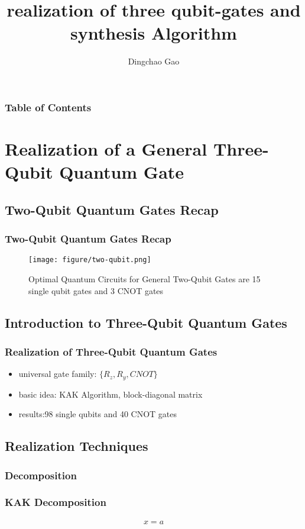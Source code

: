 \documentclass[aspectratio=1610]{beamer}
\title[gates \& synthesis]{realization of three qubit-gates and synthesis Algorithm}
\author[Gcc]{Dingchao Gao}
\institute[ISCAS]{Institute of Software Chinese Academy of Sciences}
\begin{document}
\frame{\titlepage}

\begin{frame}
\frametitle{Table of Contents}
\tableofcontents[hideallsubsections]
\end{frame}


\section{Realization of a General Three-Qubit Quantum Gate}
\subsection{Two-Qubit Quantum Gates Recap}
\begin{frame}
\frametitle{Two-Qubit Quantum Gates Recap}
\begin{figure}
  \texttt{[image: figure/two-qubit.png]}
  \caption{Optimal Quantum Circuits for General Two-Qubit Gates are 15 single qubit gates and 3 CNOT gates}
\end{figure}
\end{frame}

\subsection{Introduction to Three-Qubit Quantum Gates}
\begin{frame}
\frametitle{Realization of Three-Qubit Quantum Gates}
\begin{itemize}
  \item universal gate family: $\{R_z,R_y,CNOT\}$
  \item basic idea: KAK Algorithm, block-diagonal matrix
  \item results:98 single qubits and 40 CNOT gates
\end{itemize}
\end{frame}

\subsection{Realization Techniques}
\subsubsection{Decomposition}
\begin{frame}
\frametitle{KAK Decomposition}
\begin{align}
  x = a
\end{align}
\end{frame}
\end{document}
